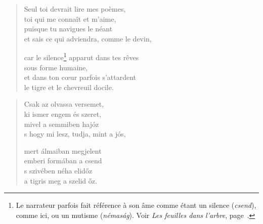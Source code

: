 \documentclass[11pt]{book}
\newcommand*{\centeredornament}{\centerline{\pgfornament[width=6cm]{88}}}
\begin{document}
\begin{verse}
  Seul toi devrait lire mes poèmes, \\
  toi qui me connaît et m'aime, \\
  puisque tu navigues le néant \\
  et sais ce qui adviendra, comme le devin,

  car le silence\footnote{Le narrateur parfois fait référence à son âme
  comme étant un silence (\emph{csend}), comme ici, ou un mutisme
  (\emph{némaság}). Voir \emph{Les feuilles dans l'arbre},
  page~\pageref{les_feuilles_dans_l_arbre}.} apparut dans tes rêves \\
  sous forme humaine, \\
  et dans ton cœur parfois s'attardent \\
  le tigre et le chevreuil docile.
\end{verse}

\newpage

\vspace*{-15mm}
\centeredornament



\begin{verse}
  Csak az olvassa versemet, \\
  ki ismer engem és szeret, \\
  mivel a semmiben hajóz \\
  s hogy mi lesz, tudja, mint a jós,

  mert álmaiban megjelent \\
  emberi formában a csend \\
  s szivében néha elidőz \\
  a tigris meg a szelid őz.
\end{verse}

\newpage

\vspace*{-15mm}
\centeredornament


\end{document}
